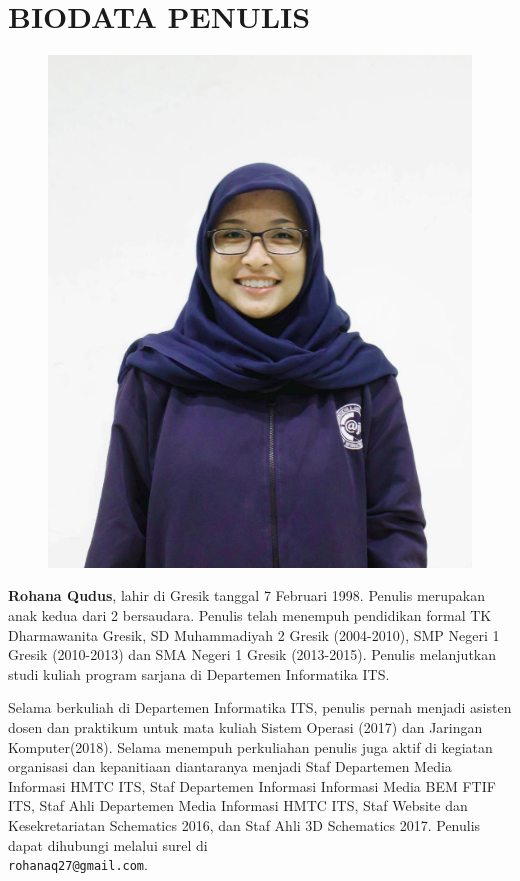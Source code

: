 \chapter{BIODATA PENULIS}
\begin{figure}
\includegraphics[height=0.3\textheight]{biodata/foto1.png}
\end{figure}

\textbf{Rohana Qudus}, lahir di Gresik tanggal 7 Februari 1998. Penulis merupakan anak kedua dari 2 bersaudara. Penulis telah menempuh pendidikan formal TK Dharmawanita Gresik, SD Muhammadiyah 2 Gresik (2004-2010), SMP Negeri 1 Gresik (2010-2013) dan SMA Negeri 1 Gresik (2013-2015). Penulis melanjutkan studi kuliah program sarjana di Departemen Informatika ITS. 

Selama berkuliah di Departemen Informatika ITS, penulis  pernah menjadi asisten dosen dan praktikum untuk mata kuliah Sistem Operasi (2017) dan Jaringan Komputer(2018). Selama menempuh perkuliahan penulis juga aktif di kegiatan organisasi dan kepanitiaan diantaranya menjadi Staf Departemen Media Informasi HMTC ITS, Staf Departemen Informasi Informasi Media BEM FTIF ITS, Staf Ahli Departemen Media Informasi HMTC ITS, Staf Website dan Kesekretariatan Schematics 2016, dan Staf Ahli 3D Schematics 2017. Penulis dapat dihubungi melalui surel di \\ \texttt{rohanaq27@gmail.com}.

